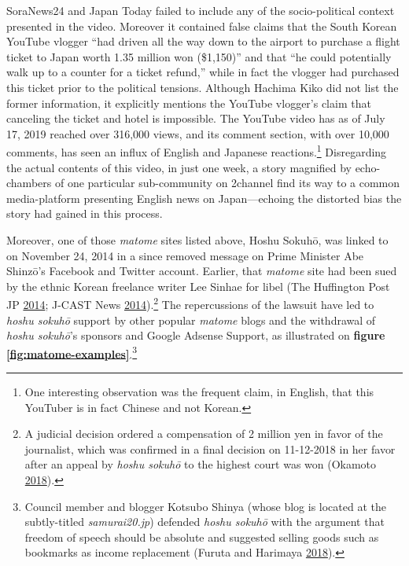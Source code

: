 \documentclass[10pt,british,A4paper,oneside]{memoir}
\begin{document}
SoraNews24 and Japan Today failed to include any of the socio-political
context presented in the video. Moreover it contained false claims that
the South Korean YouTube vlogger ``had driven all the way down to the
airport to purchase a flight ticket to Japan worth 1.35 million won
(\$1,150)'' and that ``he could potentially walk up to a counter for a
ticket refund,'' while in fact the vlogger had purchased this ticket
prior to the political tensions. Although Hachima Kiko did not list the
former information, it explicitly mentions the YouTube vlogger's claim
that canceling the ticket and hotel is impossible. The YouTube video has
as of July 17, 2019 reached over 316,000 views, and its comment section,
with over 10,000 comments, has seen an influx of English and Japanese
reactions.\footnote{One interesting observation was the frequent claim,
  in English, that this YouTuber is in fact Chinese and not Korean.}
Disregarding the actual contents of this video, in just one week, a
story magnified by echo-chambers of one particular sub-community on
2channel find its way to a common media-platform presenting English news
on Japan---echoing the distorted bias the story had gained in this
process.

Moreover, one of those \emph{matome} sites listed above, Hoshu Sokuhō,
was linked to on November 24, 2014 in a since removed message on Prime
Minister Abe Shinzō's Facebook and Twitter account. Earlier, that
\emph{matome} site had been sued by the ethnic Korean freelance writer
Lee Sinhae for libel (The Huffington Post JP
\protect\hyperlink{ref-the_huffington_post_jp_lee_2014}{2014}; J-CAST
News \protect\hyperlink{ref-j-cast_news_eng:_2014}{2014}).\footnote{A
  judicial decision ordered a compensation of 2 million yen in favor of
  the journalist, which was confirmed in a final decision on 11-12-2018
  in her favor after an appeal by \emph{hoshu sokuhō} to the highest
  court was won (Okamoto
  \protect\hyperlink{ref-okamoto_eng:_2018}{2018}).} The repercussions
of the lawsuit have led to \emph{hoshu sokuhō} support by other popular
\emph{matome} blogs and the withdrawal of \emph{hoshu sokuhō}'s sponsors
and Google Adsense Support, as illustrated on \textbf{figure
\ref{fig:matome-examples}}.\footnote{Council member and blogger Kotsubo
  Shinya (whose blog is located at the subtly-titled
  \emph{samurai20.jp}) defended \emph{hoshu sokuhō} with the argument
  that freedom of speech should be absolute and suggested selling goods
  such as bookmarks as income replacement (Furuta and Harimaya
  \protect\hyperlink{ref-furuta_eng:_2018}{2018}).}
\end{document}
